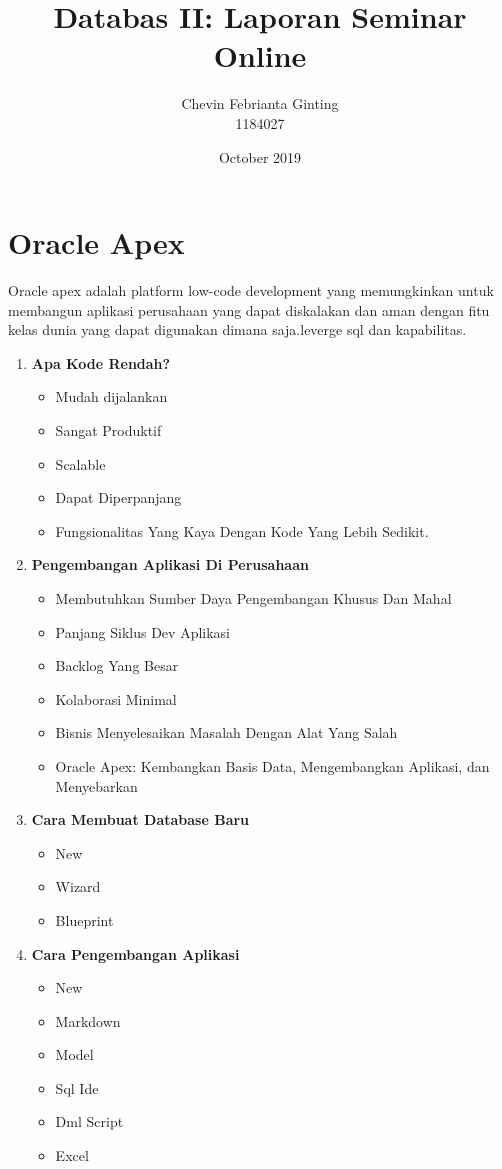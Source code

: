 \documentclass{article}
\title{Databas II: Laporan Seminar Online}
\author{Chevin Febrianta Ginting\\1184027 }
\date{October 2019}
\begin{document}
\maketitle

\section{Oracle Apex}
Oracle apex adalah platform low-code development yang memungkinkan untuk membangun aplikasi perusahaan yang dapat diskalakan dan aman dengan fitu kelas dunia yang dapat digunakan dimana saja.leverge sql dan kapabilitas.\\

\begin{enumerate}
\item \textbf{Apa Kode Rendah?}
\begin{itemize}
\item Mudah dijalankan
\item Sangat Produktif
\item Scalable
\item Dapat Diperpanjang
\item Fungsionalitas Yang Kaya Dengan Kode Yang Lebih Sedikit.\\
\end{itemize}
\item \textbf{Pengembangan Aplikasi Di Perusahaan}
\begin{itemize}
\item  Membutuhkan Sumber Daya Pengembangan Khusus Dan Mahal
\item Panjang Siklus Dev Aplikasi
\item Backlog Yang Besar
\item Kolaborasi Minimal
\item Bisnis Menyelesaikan Masalah Dengan Alat Yang Salah
\item Oracle Apex: Kembangkan Basis Data, Mengembangkan Aplikasi, dan Menyebarkan\\

\end{itemize}

\item \textbf{Cara Membuat Database Baru}
\begin{itemize}
\item New
\item Wizard
\item Blueprint

\end{itemize}
\item \textbf{Cara Pengembangan Aplikasi}
\begin{itemize}
\item  New
\item Markdown
\item Model
\item Sql Ide
\item Dml Script
\item Excel\\


\end{itemize}
\end{enumerate}
\end{document}
